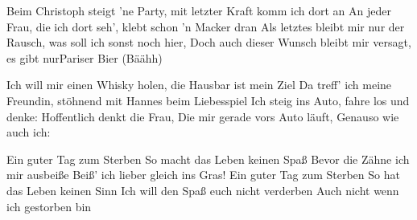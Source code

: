 \begin{guitar}
	Beim Christoph steigt 'ne Party, mit letzter Kraft komm ich dort an
	An jeder Frau, die ich dort seh', klebt schon 'n Macker dran
	Als letztes bleibt mir nur der Rausch, was soll ich sonst noch hier,
	Doch auch dieser Wunsch bleibt mir versagt, es gibt nurPariser Bier (Bäähh)
	
	Ich will mir einen Whisky holen, die Hausbar ist mein Ziel
	Da treff' ich meine Freundin, stöhnend mit Hannes beim Liebesspiel
	Ich steig ins Auto, fahre los und denke: Hoffentlich denkt die Frau,
	Die mir gerade vors Auto läuft, Genauso wie auch ich:
	
	Ein guter Tag zum Sterben
	So macht das Leben keinen Spaß
	Bevor die Zähne ich mir ausbeiße
	Beiß' ich lieber gleich ins Gras!
	Ein guter Tag zum Sterben
	So hat das Leben keinen Sinn
	Ich will den Spaß euch nicht verderben
	Auch nicht wenn ich gestorben bin
	
\end{guitar}


